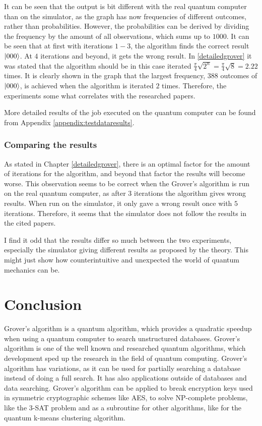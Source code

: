 \documentclass[english,oneside,openright]{UH_DS_report}
\begin{document}
It can be seen that the output is bit different with the real quantum computer than on the simulator, as the graph has now frequencies of different outcomes, rather than probabilities. However, the probabilities can be derived by dividing the frequency by the amount of all observations, which sums up to $1000$. It can be seen that at first with iterations $1 - 3$, the algorithm finds the correct result $\ket{000}$. At $4$ iterations and beyond, it gets the wrong result. In \ref{detailedgrover} it was stated that the algorithm should be in this case iterated $\frac{\pi}{4} \sqrt{2^{n}} = \frac{\pi}{4} \sqrt{8} = 2.22 $ times. It is clearly shown in the graph that the largest frequency, $388$ outcomes of $\ket{000}$, is achieved when the algorithm is iterated $2$ times. Therefore, the experiments some what correlates with the researched papers.

More detailed results of the job executed on the quantum computer can be found from Appendix \ref{appendix:testdataresults}.

\subsection{Comparing the results}
As stated in Chapter \ref{detailedgrover}, there is an optimal factor for the amount of iterations for the algorithm, and beyond that factor the results will become worse. This observation seems to be correct when the Grover's algorithm is run on the real quantum computer, as after $3$ iterations the algorithm gives wrong results. When run on the simulator, it only gave a wrong result once with $5$ iterations. Therefore, it seems that the simulator does not follow the results in the cited papers.

I find it odd that the results differ so much between the two experiments, especially the simulator giving different results as proposed by the theory. This might just show how counterintuitive and unexpected the world of quantum mechanics can be.

\chapter{Conclusion}
\label{chpater:conclusion}

Grover's algorithm is a quantum algorithm, which provides a quadratic speedup when using a quantum computer to search unstructured databases. Grover's algorithm is one of the well known and researched quantum algorithms, which development sped up the research in the field of quantum computing. Grover's algorithm has variations, as it can be used for partially searching a database instead of doing a full search. It has also applications outside of databases and data searching. Grover's algorithm can be applied to break encryption keys used in symmetric cryptographic schemes like AES, to solve NP-complete problems, like the 3-SAT problem and as a subroutine for other algorithms, like for the quantum k-means clustering algorithm.
\end{document}
